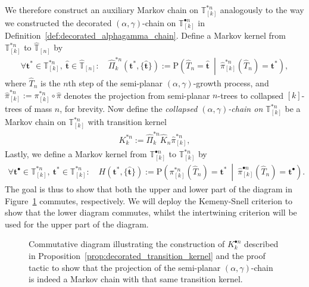 \documentclass[a4paper, final]{amsart}
\theoremstyle{plain}
\theoremstyle{definition}
\newcommand{\tree}[1][t]{\boldsymbol{#1}}
\newcommand{\that}[1][t]{\hat{\boldsymbol{#1}}} %
\newcommand{\That}[1][T]{\widehat{#1}}
\newcommand{\Thatspace}[1][\T]{\widehat{\boldsymbol{#1}}} %
\newcommand{\T}{\mathbb{T}}
\renewcommand{\P}{\mathrm{P}}
\begin{document}
We therefore construct an auxiliary Markov chain on $\T_{[k]}^{* n}$ analogously to the way we constructed the decorated $(\alpha, \gamma)$-chain on $\T_{[k]}^{\bullet n}$ in Definition~\ref{def:decorated_alphagamma_chain}.
Define a Markov kernel from $\T_{[k]}^{* n}$ to $\Thatspace_{[n]}$ by
\begin{align}
  \forall \tree^* \in \T_{[k]}^{* n}, \ \that \in \Thatspace_{[n]} \colon \quad
  {\hat{\Pi}}_k^{* n} (\tree^*, \{\that\}) :=
  \P \left( \That_n = \that \ \middle \vert \ \hat{\pi}_{[k]}^{* n} \left(\That_n\right) = \tree^* \right),
  \label{eq:collapsedkernel}
\end{align}
where $\That_n$ is the $n$th step of the semi-planar $(\alpha, \gamma)$-growth process, and $\hat{\pi}_{[k]}^{* n} := \pi_{[k]}^{* n} \circ \hat{\pi}$ denotes the  projection from semi-planar $n$-trees to collapsed $[k]$-trees of mass $n$, for brevity.
Now define the \textit{collapsed $(\alpha, \gamma)$-chain on $\T_{[k]}^{* n}$} be a Markov chain on $\T_{[k]}^{* n}$ with transition kernel 
%
\begin{align}
  K_k^{* n} := {\hat{\Pi}}_k^{* n} \hat{K}_n \hat{\pi}_{[k]}^{* n},
  \label{eq:transitionkernel_collapsed}
\end{align}
%
Lastly, we define a Markov kernel from $\T_{[k]}^{\bullet n}$ to $\T_{[k]}^{* n}$ by
%
\begin{align}
  \forall \tree^\bullet \in \T_{[k]}^{* n}, \ \tree^* \in \T_{[k]}^{* n} \colon \quad
  H (\tree^*, \{\that\}) :=
  \P \left( \pi_{[k]}^{* n} \left( \That_n \right) = \tree^* \ \middle \vert \ \hat{\pi}_{[k]}^{\bullet n} \left(\That_n\right) = \tree^\bullet \right).
  \label{eq:kernel_collapsed_decorated}
\end{align}
The goal is thus to show that both the upper and lower part of the diagram in Figure~\ref{fig:commutativediagram_complete} commutes, respectively.
We will deploy the Kemeny-Snell criterion to show that the lower diagram commutes, whilst the intertwining criterion will be used for the upper part of the diagram.
%
\begin{figure}[t]
  \centering
  \caption{Commutative diagram illustrating the construction of $K_k^{\bullet n}$ described in Proposition~\ref{prop:decorated_transition_kernel} and the proof tactic to show that the projection of the semi-planar $(\alpha, \gamma)$-chain is indeed a Markov chain with that same transition kernel.}
  \label{fig:commutativediagram_complete}
\end{figure}
\end{document}

